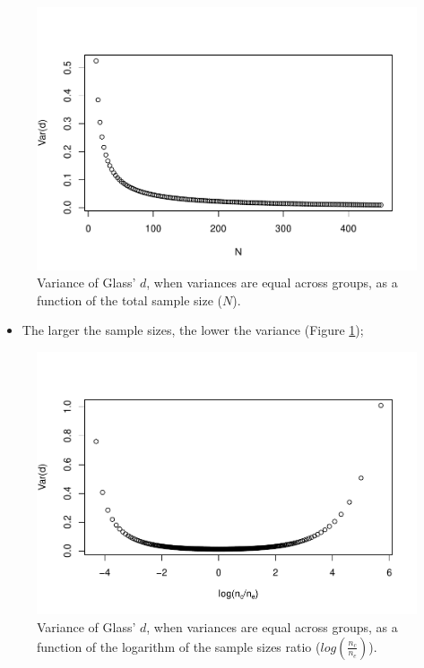 \documentclass[
  english,
  man,mask]{apa6}
\providecommand{\tightlist}{%
  \setlength{\itemsep}{0pt}\setlength{\parskip}{0pt}}
\begin{document}
\begin{figure}
\centering
\includegraphics{Theoretical-Variance-of-all-estimators-as-a-function-of-population-parameters_files/figure-latex/varglassNsize2-1.pdf}
\caption{\label{fig:varglassNsize2}Variance of Glass' \(d\), when variances are equal across groups, as a function of the total sample size (\(N\)).}
\end{figure}

\begin{itemize}
\tightlist
\item
  The larger the sample sizes, the lower the variance (Figure \ref{fig:varglassNsize2});
\end{itemize}

\begin{figure}
\centering
\includegraphics{Theoretical-Variance-of-all-estimators-as-a-function-of-population-parameters_files/figure-latex/varglasshomNratio2-1.pdf}
\caption{\label{fig:varglasshomNratio2}Variance of Glass' \(d\), when variances are equal across groups, as a function of the logarithm of the sample sizes ratio (\(log\left(\frac{n_c}{n_e} \right)\)).}
\end{figure}
\end{document}
